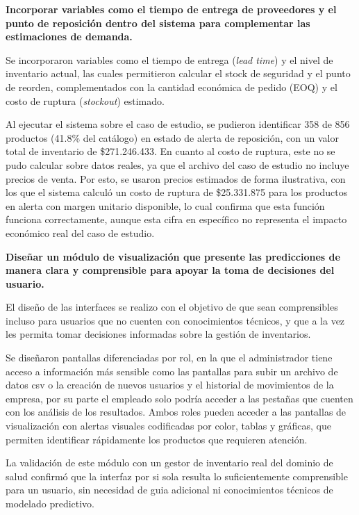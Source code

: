 \textbf{Incorporar variables como el tiempo de entrega de proveedores y el punto de reposición dentro del sistema para complementar las estimaciones de demanda.} 

Se incorporaron variables como el tiempo de entrega (\textit{lead time}) y el nivel de inventario actual, las cuales permitieron calcular el stock de seguridad y el punto de reorden, complementados con la cantidad económica de pedido (EOQ) y el costo de ruptura (\textit{stockout}) estimado. 

Al ejecutar el sistema sobre el caso de estudio, se pudieron identificar 358 de 856 productos (41.8\% del catálogo) en estado de alerta de reposición, con un valor total de inventario de \$271.246.433. En cuanto al costo de ruptura, este no se pudo calcular sobre datos reales, ya que el archivo del caso de estudio no incluye precios de venta. Por esto, se usaron precios estimados de forma ilustrativa, con los que el sistema calculó un costo de ruptura de \$25.331.875 para los productos en alerta con margen unitario disponible, lo cual confirma que esta función funciona correctamente, aunque esta cifra en específico no representa el impacto económico real del caso de estudio.

\textbf{Diseñar un módulo de visualización que presente las predicciones de manera clara y comprensible para apoyar la toma de decisiones del usuario.} 

El diseño de las interfaces se realizo con el objetivo de que sean comprensibles incluso para usuarios que no cuenten con conocimientos técnicos, y que a la vez les permita tomar decisiones informadas sobre la gestión de inventarios.

Se diseñaron pantallas diferenciadas por rol, en la que el administrador tiene acceso a información más sensible como las pantallas para subir un archivo de datos csv o la creación de nuevos usuarios y el historial de movimientos de la empresa, por su parte el empleado solo podría acceder a las pestañas que cuenten con los análisis de los resultados. Ambos roles pueden acceder a las pantallas de visualización con alertas visuales codificadas por color, tablas y gráficas, que permiten identificar rápidamente los productos que requieren atención.

La validación de este módulo con un gestor de inventario real del dominio de salud confirmó que la interfaz por si sola resulta lo suficientemente comprensible para un usuario, sin necesidad de guia adicional ni conocimientos técnicos de modelado predictivo.

